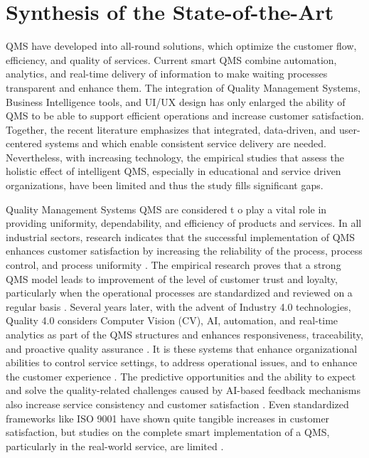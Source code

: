 \documentclass{research}
\begin{document}
\section{Synthesis of the State-of-the-Art}

\indent QMS have developed into all-round solutions, which optimize the customer flow, efficiency, and quality of services. Current smart QMS combine automation, analytics, and real-time delivery of information to make waiting processes transparent and enhance them. The integration of Quality Management Systems, Business Intelligence tools, and UI/UX design has only enlarged the ability of QMS to be able to support efficient operations and increase customer satisfaction. Together, the recent literature emphasizes that integrated, data-driven, and user-centered systems and which enable consistent service delivery are needed. Nevertheless, with increasing technology, the empirical studies that assess the holistic effect of intelligent QMS, especially in educational and service driven organizations, have been limited and thus the study fills significant gaps.

Quality Management Systems QMS are considered t o play a vital role in providing uniformity, dependability, and efficiency of products and services. In all industrial sectors, research indicates that the successful implementation of QMS enhances customer satisfaction by increasing the reliability of the process, process control, and process uniformity \cite{ref8} \cite{ref13} \cite{ref23} \cite{ref19}. The empirical research proves that a strong QMS model leads to improvement of the level of customer trust and loyalty, particularly when the operational processes are standardized and reviewed on a regular basis \cite{ref39} \cite{ref14} \cite{ref25}. Several years later, with the advent of Industry 4.0 technologies, Quality 4.0 considers Computer Vision (CV), AI, automation, and real-time analytics as part of the QMS structures and enhances responsiveness, traceability, and proactive quality assurance \cite{ref7} \cite{ref34} \cite{ref31} \cite{ref17}. It is these systems that enhance organizational abilities to control service settings, to address operational issues, and to enhance the customer experience \cite{ref37} \cite{ref29} \cite{ref85}. The predictive opportunities and the ability to expect and solve the quality-related challenges caused by AI-based feedback mechanisms also increase service consistency and customer satisfaction \cite{ref55} \cite{ref10} \cite{ref11} \cite{ref18} \cite{ref6}. Even standardized frameworks like ISO 9001 have shown quite tangible increases in customer satisfaction, but studies on the complete smart implementation of a QMS, particularly in the real-world service, are limited  \cite{ref15} \cite{ref36} \cite{ref26}.
\end{document}
